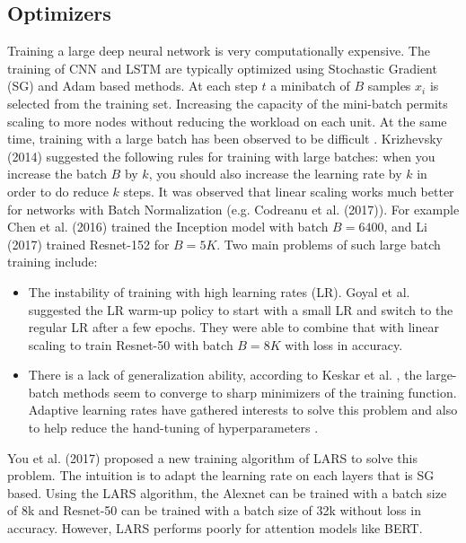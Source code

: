 \subsection{Optimizers}


Training a large deep neural network is very computationally expensive. The training of CNN and LSTM are typically optimized using Stochastic Gradient (SG) and Adam based methods.  At each step $t$ a minibatch of $B$ samples $x_i$
is selected from the training set. Increasing the capacity of the mini-batch permits scaling to more nodes without reducing
the workload on each unit. At the same time, training with a large batch has been observed to be difficult \cite{Krizhevsky}. Krizhevsky (2014) suggested the following rules for training with large batches: when you increase
the batch $B$ by $k$, you should also increase the learning rate by $k$ in order to do reduce $k$ steps.  It was observed that linear scaling works much better for networks with Batch
Normalization (e.g. Codreanu et al. (2017)). For example Chen et al. (2016) trained the Inception
model with batch $B=6400$, and Li (2017) trained Resnet-152 for $B=5K$. Two main problems of such large batch training include: 

\begin{itemize}
    \item The instability of training with high learning rates (LR). Goyal et al. suggested the LR warm-up policy to start with a small LR and switch to the regular LR after a few epochs. They were able to combine that with linear scaling to train Resnet-50 with batch $B=8K$ with loss in accuracy. 
    
    \item There is a lack of generalization ability, according to Keskar et al. \cite{Keskar}, the large-batch methods seem to converge to sharp minimizers of the training function. Adaptive learning rates have gathered interests to solve this problem and also to help reduce the hand-tuning of hyperparameters \cite{}.  
\end{itemize}




You et al. (2017) proposed a new training algorithm of LARS to solve this problem. The intuition is to adapt the learning rate on each layers that is SG based. Using the LARS algorithm, the Alexnet can be trained with a batch size of 8k and Resnet-50 can be trained with a batch size of 32k without loss in accuracy. However, LARS performs poorly for attention models like BERT. 


